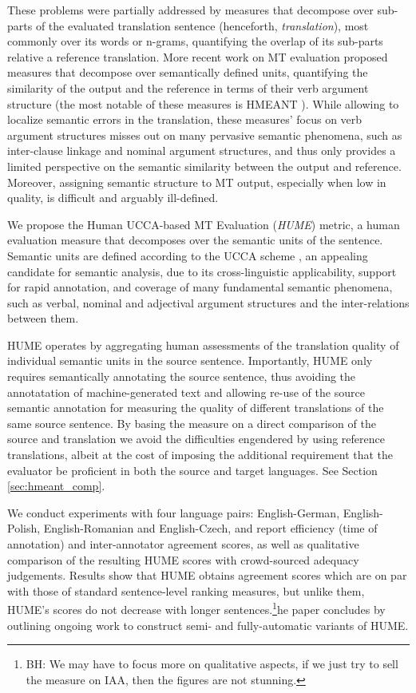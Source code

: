 \documentclass[11pt]{article}
\newcommand{\secref}[1]{Section \ref{#1}}
\newcommand{\bh}[2]{\footnote{\color{blue}BH: #1}}
\begin{document}
These problems were partially addressed by measures that decompose over sub-parts of the evaluated
translation sentence (henceforth, {\it translation}),
most commonly over its words or n-grams,
quantifying the overlap of its sub-parts relative a reference translation.
More recent work on MT evaluation proposed measures
that decompose over semantically defined units,
quantifying the similarity of the output and the reference in terms of
their verb argument structure (the most notable of these measures is
HMEANT \cite{lo2011structured}).
While allowing to localize semantic errors in the translation,
these measures' focus on verb argument structures misses out on many pervasive semantic phenomena,
such as inter-clause linkage and nominal argument structures, and thus only provides
a limited perspective on the semantic similarity between the output and reference.
Moreover, assigning semantic structure to MT output, especially when low in quality,
is difficult and arguably ill-defined.

We propose the Human UCCA-based MT Evaluation ({\it HUME}) metric,
a human evaluation measure that decomposes over the semantic units of the sentence.
Semantic units are defined according to the 
UCCA scheme \cite{abend2013universal}, an appealing candidate for semantic analysis,
due to its cross-linguistic applicability, support for rapid annotation, and coverage
of many fundamental semantic phenomena, such as verbal, nominal and adjectival
argument structures and the inter-relations between them.

HUME operates by aggregating human assessments of the translation quality of individual
semantic units in the source sentence.
Importantly, HUME only requires semantically annotating the source sentence,
thus avoiding the annotatation of machine-generated text 
and allowing re-use of the source semantic annotation for measuring the quality
of different translations of the same source sentence.
By basing the measure on a direct comparison
of the source and translation we avoid the difficulties engendered by using
reference translations, albeit at the cost of imposing the additional requirement
that the evaluator be proficient in both the source and target languages.
See \secref{sec:hmeant_comp}.

We conduct experiments with four language pairs: English-German, English-Polish,
English-Romanian and English-Czech, and report efficiency (time of annotation) and
inter-annotator agreement scores, as well as qualitative comparison of the resulting
HUME scores with crowd-sourced adequacy judgements. Results show that HUME obtains 
agreement scores which are on par with those of standard sentence-level ranking measures,
but unlike them, HUME's scores do not decrease with longer sentences.\bh{We may
  have to focus more on qualitative aspects, if we just try to sell
  the measure on IAA, then the figures are not stunning.}
The paper concludes by outlining ongoing work to construct semi- and
fully-automatic variants of HUME.
\end{document}
